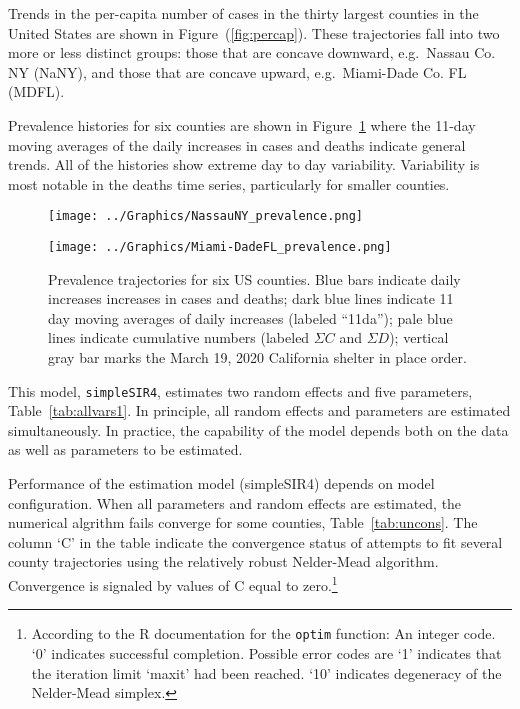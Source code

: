 \documentclass[12pt,letterpaper]{article}
\newcommand\help[1]{\color{Magenta}{\it #1 }\normalcolor}
\newcommand\EG{e.g.\ }
\newcommand\SSm{{\tt simpleSIR4}}
\begin{document}
Trends in the per-capita number of cases in the thirty largest counties in the
United States are shown in Figure~(\ref{fig:percap}).
These trajectories fall into two more or less distinct groups: those
that are concave downward, \EG Nassau Co. NY (NaNY), and those that are
concave upward, \EG Miami-Dade Co. FL (MDFL).

Prevalence histories for six counties are shown in
Figure~\ref{fig:prev} where the 11-day moving averages of the daily
increases in cases and deaths indicate general trends.
All of the histories show extreme day to day variability.
Variability is most notable in the deaths
time series, particularly for smaller counties.

\begin{figure}
{\scriptsize
\begin{center}
\texttt{[image: ../Graphics/NassauNY\_prevalence.png]}
\par
\texttt{[image: ../Graphics/Miami-DadeFL\_prevalence.png]}
\end{center}
}
\caption{\label{fig:prev}
Prevalence trajectories for six US counties.
Blue bars indicate daily increases increases in cases and deaths;
dark blue lines indicate 11 day moving averages of daily increases
(labeled ``11da''); 
pale blue lines indicate cumulative numbers (labeled $\Sigma C$ and
$\Sigma D$); 
vertical gray bar marks the March 19, 2020 California shelter in place order.
\help{remove annotations.}
}
\end{figure}

This model, \SSm , estimates two random effects and five
parameters, Table~\ref{tab:allvars1}.
In principle, all random effects and parameters are estimated
simultaneously.
In practice, the capability of the model 
depends both on the data as well as parameters to be
estimated. 

Performance of the estimation model (simpleSIR4) depends on
model configuration. When all parameters and random effects are
estimated, the numerical algrithm fails converge for some counties,
Table~\ref{tab:uncons}. The column `C' in the table
indicate the convergence status of attempts to fit several county
trajectories using the relatively robust Nelder-Mead algorithm.
Convergence is signaled by values of C equal to
zero.\footnote{According to the R documentation for the {\tt optim}
function: An integer code. ‘0’
indicates successful completion.  Possible error codes are
          ‘1’ indicates that the iteration limit ‘maxit’ had been
              reached.
          ‘10’ indicates degeneracy of the Nelder-Mead simplex.
}
\end{document}
